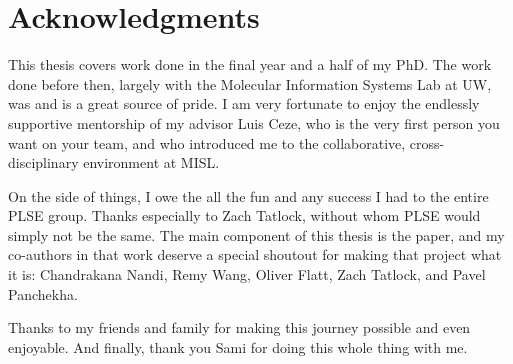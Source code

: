 \documentclass[12pt]{book}
\begin{document}
\chapter*{Acknowledgments}

This thesis covers work done in the final year and a half of my PhD.
The work done before then,
 largely with the Molecular Information Systems Lab at UW,
 was and is a great source of pride.
I am very fortunate to enjoy the
 endlessly supportive mentorship of my advisor Luis Ceze,
 who is the very first person you want on your team,
 and who introduced me to
 the collaborative, cross-disciplinary environment at MISL.

On the \egg side of things,
 I owe the all the fun and any success
 I had to the entire PLSE group.
Thanks especially to Zach Tatlock,
 without whom PLSE would simply not be the same.
The main component of this thesis is the \egg
 paper, and my co-authors
 in that work deserve a special shoutout for making
 that project what it is:
 Chandrakana Nandi,
 Remy Wang,
 Oliver Flatt,
 Zach Tatlock,
 and Pavel Panchekha.

Thanks to my friends and family for
 making this journey possible and even enjoyable.
And finally,
 thank you Sami for doing this whole thing with me.

\clearpage

\pagestyle{headings}
\setcounter{page}{1}
\renewcommand{\chaptermark}[1]{\markboth{\sc{\chaptername\ \thechapter.\ #1}}{}}
\renewcommand{\sectionmark}[1]{\markright{\sc{\thesection.\ #1}}{}}








\clearpage
{}
\singlespacing


\end{document}
